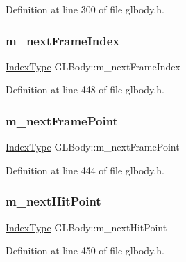 Definition at line 300 of file glbody.\+h.

\mbox{\label{class_g_l_body_aef3425aa1efb75b2c758b83372d427d1}} 
\subsubsection{\texorpdfstring{m\_nextFrameIndex}{m\_nextFrameIndex}}
{\footnotesize\ttfamily \mbox{\hyperlink{gldefines_8h_af3c748960f29c42e5b7f1dc449ab66ff}{Index\+Type}} G\+L\+Body\+::m\+\_\+next\+Frame\+Index\hspace{0.3cm}{\ttfamily [protected]}}



Definition at line 448 of file glbody.\+h.

\mbox{\label{class_g_l_body_a1af4cb49c0510aa2afe09670689f3911}} 
\subsubsection{\texorpdfstring{m\_nextFramePoint}{m\_nextFramePoint}}
{\footnotesize\ttfamily \mbox{\hyperlink{gldefines_8h_af3c748960f29c42e5b7f1dc449ab66ff}{Index\+Type}} G\+L\+Body\+::m\+\_\+next\+Frame\+Point\hspace{0.3cm}{\ttfamily [protected]}}



Definition at line 444 of file glbody.\+h.

\mbox{\label{class_g_l_body_af5eb940d625aee425a9fcff361e75d2b}} 
\subsubsection{\texorpdfstring{m\_nextHitPoint}{m\_nextHitPoint}}
{\footnotesize\ttfamily \mbox{\hyperlink{gldefines_8h_af3c748960f29c42e5b7f1dc449ab66ff}{Index\+Type}} G\+L\+Body\+::m\+\_\+next\+Hit\+Point\hspace{0.3cm}{\ttfamily [protected]}}



Definition at line 450 of file glbody.\+h.

